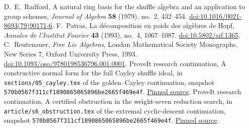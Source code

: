 D.~E.~Radford, A natural ring basis for the shuffle algebra and an
application to group schemes, \emph{Journal of Algebra} \textbf{58}
(1979), no.~2, 432--454.
\href{https://doi.org/10.1016/0021-8693(79)90171-6}{doi:10.1016/0021-8693(79)90171-6}.
F.~Patras, La d\'ecomposition en poids des alg\`ebres de Hopf,
\emph{Annales de l'Institut Fourier} \textbf{43} (1993), no.~4,
1067--1087. \href{https://doi.org/10.5802/aif.1365}{doi:10.5802/aif.1365}.
C.~Reutenauer, \emph{Free Lie Algebras}, London Mathematical Society
Monographs, New Series 7, Oxford University Press, 1993.
\href{https://doi.org/10.1093/oso/9780198536796.001.0001}{doi:10.1093/oso/9780198536796.001.0001}.
ProveIt research continuation, A constructive normal form for the full
Cayley shuffle ideal, in
\texttt{sections/05\_cayley.tex} of the golden--Cayley continuation,
snapshot \texttt{570b0567f311cf1890865065896be2665f469e4f}.
\href{https://github.com/VladimirReshetnikov/ProveIt/blob/570b0567f311cf1890865065896be2665f469e4f/Analysis/Polylogarithms/docs/reports/fractional-cayley-scaling/continuations/golden-cayley-double-turning/sections/05_cayley.tex}{Pinned source}.
ProveIt research continuation, A certified obstruction in the weight-seven
reduction search, in
\texttt{article/s6\_obstruction.tex} of the extremal cyclic-descent continuation,
snapshot \texttt{570b0567f311cf1890865065896be2665f469e4f}.
\href{https://github.com/VladimirReshetnikov/ProveIt/blob/570b0567f311cf1890865065896be2665f469e4f/Analysis/Polylogarithms/docs/reports/formal-reductions-continuation/continuations/extremal-cyclic-descent/article/s6_obstruction.tex}{Pinned source}.
